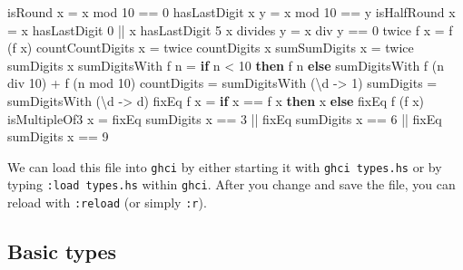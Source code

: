 \documentclass[11pt,
  american,
  DIV13]{article}
\newenvironment{Shaded}{}{}
\newcommand{\DecValTok}[1]{\textcolor[rgb]{0.25,0.63,0.44}{#1}}
\newcommand{\KeywordTok}[1]{\textcolor[rgb]{0.00,0.44,0.13}{\textbf{#1}}}
\newcommand{\NormalTok}[1]{#1}
\newcommand{\OperatorTok}[1]{\textcolor[rgb]{0.40,0.40,0.40}{#1}}
\newcommand{\OtherTok}[1]{\textcolor[rgb]{0.00,0.44,0.13}{#1}}
\begin{document}
\begin{Shaded}
\begin{Highlighting}[]
\NormalTok{isRound x }\OtherTok{=}\NormalTok{ x }\OtherTok{\textasciigrave{}mod\textasciigrave{}} \DecValTok{10} \OperatorTok{==} \DecValTok{0}
\NormalTok{hasLastDigit x y }\OtherTok{=}\NormalTok{ x }\OtherTok{\textasciigrave{}mod\textasciigrave{}} \DecValTok{10} \OperatorTok{==}\NormalTok{ y}
\NormalTok{isHalfRound x }\OtherTok{=}\NormalTok{ x }\OtherTok{\textasciigrave{}hasLastDigit\textasciigrave{}} \DecValTok{0} \OperatorTok{||}\NormalTok{ x }\OtherTok{\textasciigrave{}hasLastDigit\textasciigrave{}} \DecValTok{5}
\NormalTok{    x }\OtherTok{\textasciigrave{}divides\textasciigrave{}}\NormalTok{ y }\OtherTok{=}\NormalTok{ x }\OtherTok{\textasciigrave{}div\textasciigrave{}}\NormalTok{ y }\OperatorTok{==} \DecValTok{0}
\NormalTok{twice f x }\OtherTok{=}\NormalTok{ f (f x)}
\NormalTok{countCountDigits x }\OtherTok{=}\NormalTok{ twice countDigits x}
\NormalTok{sumSumDigits x }\OtherTok{=}\NormalTok{ twice sumDigits x}
\NormalTok{sumDigitsWith f n }\OtherTok{=} \KeywordTok{if}\NormalTok{ n }\OperatorTok{\textless{}} \DecValTok{10} \KeywordTok{then}\NormalTok{ f n }
\KeywordTok{    else}\NormalTok{ sumDigitsWith f (n }\OtherTok{\textasciigrave{}div\textasciigrave{}} \DecValTok{10}\NormalTok{) }\OperatorTok{+}\NormalTok{ f (n }\OtherTok{\textasciigrave{}mod\textasciigrave{}} \DecValTok{10}\NormalTok{)}
\NormalTok{countDigits }\OtherTok{=}\NormalTok{ sumDigitsWith (\textbackslash{}d }\OtherTok{{-}\textgreater{}} \DecValTok{1}\NormalTok{)}
\NormalTok{sumDigits }\OtherTok{=}\NormalTok{ sumDigitsWith (\textbackslash{}d }\OtherTok{{-}\textgreater{}}\NormalTok{ d)}
\NormalTok{fixEq f x }\OtherTok{=} \KeywordTok{if}\NormalTok{ x }\OperatorTok{==}\NormalTok{ f x }\KeywordTok{then}\NormalTok{ x }\KeywordTok{else}\NormalTok{ fixEq f (f x)}
\NormalTok{isMultipleOf3 x }\OtherTok{=}\NormalTok{ fixEq sumDigits x }\OperatorTok{==} \DecValTok{3} \OperatorTok{||}
\NormalTok{   fixEq sumDigits x }\OperatorTok{==} \DecValTok{6} \OperatorTok{||}\NormalTok{ fixEq sumDigits x }\OperatorTok{==} \DecValTok{9}
\end{Highlighting}
\end{Shaded}

We can load this file into \texttt{ghci} by either starting it with
\texttt{ghci\ types.hs} or by typing \texttt{:load\ types.hs} within
\texttt{ghci}. After you change and save the file, you can reload with
\texttt{:reload} (or simply \texttt{:r}).

\hypertarget{basic-types}{%
\subsection{Basic types}\label{basic-types}}
\end{document}
